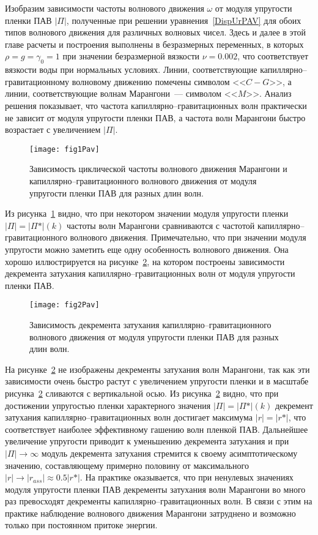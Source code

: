 Изобразим зависимости частоты волнового движения $ \omega $ от модуля упругости пленки ПАВ $ \vert \Pi \vert $, полученные при решении уравнения~\eqref{DispUrPAV} для обоих типов волнового движения для различных волновых чисел. Здесь и далее в этой главе расчеты и построения выполнены в безразмерных переменных, в которых $ \rho = g = \gamma_{0}=1 $ при значении безразмерной вязкости $ \nu = 0.002 $, что соответствует вязкости воды при нормальных условиях. Линии, соответствующие капиллярно--гравитационному волновому движению помечены символом <<$ C-G $>>, а линии, соответствующие волнам Марангони~--- символом <<$ M $>>. Анализ решения показывает, что частота капиллярно--гравитационных волн практически не зависит от модуля упругости пленки ПАВ, а частота волн Марангони быстро возрастает с увеличением $ \vert \Pi \vert $. 
\begin{figure}[ht]
\centering
\texttt{[image: fig1Pav]}
\caption{Зависимость циклической частоты волнового движения Марангони и капиллярно--гравитационного волнового движения от модуля упругости пленки ПАВ для разных длин волн.}\label{fig:Fig1PAV}
\end{figure} 
Из рисунка~\ref{fig:Fig1PAV} видно, что при некотором значении модуля упругости пленки $ \vert \Pi \vert = \vert \Pi* \vert \left( k \right) $ частоты волн Марангони  сравниваются с частотой капиллярно--гравитационного волнового движения. Примечательно, что при значении модуля упругости можно заметить еще одну особенность волнового движения. Она хорошо иллюстрируется на рисунке~\ref{fig:Fig2PAV}, на котором построены зависимости декремента затухания капиллярно--гравитационных волн от модуля упругости пленки ПАВ.
\begin{figure}[ht]
\centering
\texttt{[image: fig2Pav]}
\caption{Зависимость декремента затухания капиллярно--гравитационного волнового движения от модуля упругости пленки ПАВ для разных длин волн.}\label{fig:Fig2PAV}
\end{figure} 
На рисунке~\ref{fig:Fig2PAV} не изображены декременты затухания волн Марангони, так как эти зависимости очень быстро растут с увеличением упругости пленки и в масштабе рисунка~\ref{fig:Fig2PAV} сливаются с вертикальной осью. Из рисунка~\ref{fig:Fig2PAV} видно, что при достижении упругостью пленки характерного значения $ \vert \Pi \vert = \vert \Pi* \vert \left( k \right) $  декремент затухания капиллярно--гравитационных волн достигает максимума $ \vert r \vert = \vert r* \vert $, что соответствует наиболее эффективному гашению волн пленкой ПАВ. Дальнейшее увеличение упругости приводит к уменьшению декремента затухания и при $ \vert \Pi \vert \rightarrow \infty $ модуль декремента затухания стремится к своему асимптотическому значению, составляющему примерно половину от максимального $ \vert r \vert \rightarrow \vert r_{ass} \vert \approx 0.5 \vert r* \vert  $. На практике оказывается, что при ненулевых значениях модуля упругости пленки ПАВ декременты затухания волн Марангони во много раз превосходят декременты капиллярно--гравитационных волн. В связи с этим на практике наблюдение волнового движения Марангони затруднено и возможно только при постоянном притоке энергии. 
